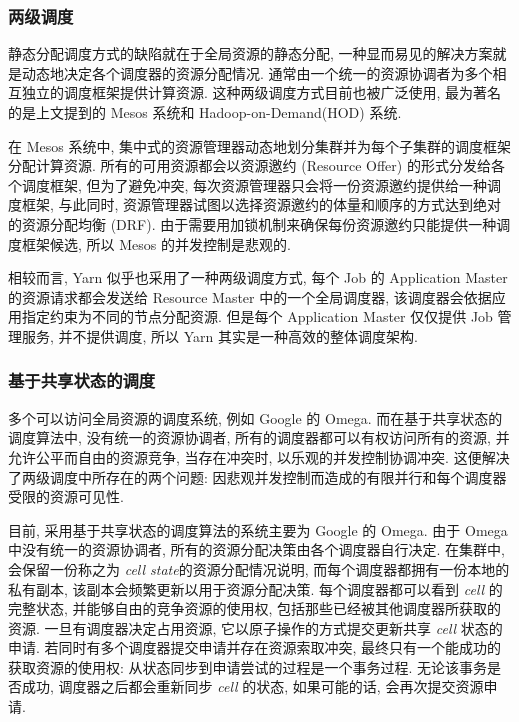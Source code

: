 \documentclass[UTF8,a4paper]{ctexart}
\begin{document}
\subsubsection{两级调度}
静态分配调度方式的缺陷就在于全局资源的静态分配, 一种显而易见的解决方案就是动态地决定各个调度器的资源分配情况. 通常由一个统一的资源协调者为多个相互独立的调度框架提供计算资源. 这种两级调度方式目前也被广泛使用, 最为著名的是上文提到的 Mesos 系统和 Hadoop-on-Demand(HOD)\cite{HOD2012} 系统.

在 Mesos 系统中, 集中式的资源管理器动态地划分集群并为每个子集群的调度框架分配计算资源. 所有的可用资源都会以资源邀约 (Resource Offer) 的形式分发给各个调度框架, 但为了避免冲突, 每次资源管理器只会将一份资源邀约提供给一种调度框架, 与此同时, 资源管理器试图以选择资源邀约的体量和顺序的方式达到绝对的资源分配均衡 (DRF)\cite{DRF2011}. 由于需要用加锁机制来确保每份资源邀约只能提供一种调度框架候选, 所以 Mesos 的并发控制是悲观的.

相较而言, Yarn 似乎也采用了一种两级调度方式, 每个 Job 的 Application Master 的资源请求都会发送给 Resource Master 中的一个全局调度器, 该调度器会依据应用指定约束为不同的节点分配资源. 但是每个 Application Master 仅仅提供 Job 管理服务, 并不提供调度, 所以 Yarn 其实是一种高效的整体调度架构.

\subsubsection{基于共享状态的调度}
多个可以访问全局资源的调度系统, 例如 Google 的 Omega.
而在基于共享状态的调度算法中, 没有统一的资源协调者, 所有的调度器都可以有权访问所有的资源, 并允许公平而自由的资源竞争, 当存在冲突时, 以乐观的并发控制协调冲突. 这便解决了两级调度中所存在的两个问题: 因悲观并发控制而造成的有限并行和每个调度器受限的资源可见性. 

目前, 采用基于共享状态的调度算法的系统主要为 Google 的 Omega. 由于 Omega 中没有统一的资源协调者, 所有的资源分配决策由各个调度器自行决定. 在集群中, 会保留一份称之为 \textit{cell state}\cite{HOD2012}的资源分配情况说明, 而每个调度器都拥有一份本地的私有副本, 该副本会频繁更新以用于资源分配决策. 每个调度器都可以看到 \textit{cell} 的完整状态, 并能够自由的竞争资源的使用权, 包括那些已经被其他调度器所获取的资源. 一旦有调度器决定占用资源, 它以原子操作的方式提交更新共享 \textit{cell} 状态的申请. 若同时有多个调度器提交申请并存在资源索取冲突, 最终只有一个能成功的获取资源的使用权: 从状态同步到申请尝试的过程是一个事务过程. 无论该事务是否成功, 调度器之后都会重新同步 \textit{cell} 的状态, 如果可能的话, 会再次提交资源申请. 
\end{document}
